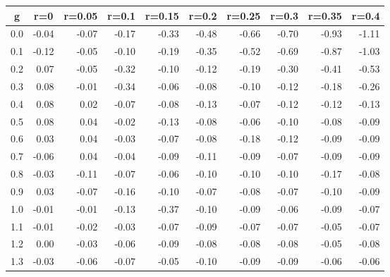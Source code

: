 %
\begin{table}[!tbp]
 \begin{center}
 \begin{tabular}{rrrrrrrrrr}\hline\hline
\multicolumn{1}{c}{g}&\multicolumn{1}{c}{r=0}&\multicolumn{1}{c}{r=0.05}&\multicolumn{1}{c}{r=0.1}&\multicolumn{1}{c}{r=0.15}&\multicolumn{1}{c}{r=0.2}&\multicolumn{1}{c}{r=0.25}&\multicolumn{1}{c}{r=0.3}&\multicolumn{1}{c}{r=0.35}&\multicolumn{1}{c}{r=0.4}\tabularnewline
\hline
0.0&-0.04&-0.07&-0.17&-0.33&-0.48&-0.66&-0.70&-0.93&-1.11\tabularnewline
0.1&-0.12&-0.05&-0.10&-0.19&-0.35&-0.52&-0.69&-0.87&-1.03\tabularnewline
0.2& 0.07&-0.05&-0.32&-0.10&-0.12&-0.19&-0.30&-0.41&-0.53\tabularnewline
0.3& 0.08&-0.01&-0.34&-0.06&-0.08&-0.10&-0.12&-0.18&-0.26\tabularnewline
0.4& 0.08& 0.02&-0.07&-0.08&-0.13&-0.07&-0.12&-0.12&-0.13\tabularnewline
0.5& 0.08& 0.04&-0.02&-0.13&-0.08&-0.06&-0.10&-0.08&-0.09\tabularnewline
0.6& 0.03& 0.04&-0.03&-0.07&-0.08&-0.18&-0.12&-0.09&-0.09\tabularnewline
0.7&-0.06& 0.04&-0.04&-0.09&-0.11&-0.09&-0.07&-0.09&-0.09\tabularnewline
0.8&-0.03&-0.11&-0.07&-0.06&-0.10&-0.10&-0.10&-0.17&-0.08\tabularnewline
0.9& 0.03&-0.07&-0.16&-0.10&-0.07&-0.08&-0.07&-0.10&-0.09\tabularnewline
1.0&-0.01&-0.01&-0.13&-0.37&-0.10&-0.09&-0.06&-0.09&-0.07\tabularnewline
1.1&-0.01&-0.02&-0.03&-0.07&-0.09&-0.07&-0.07&-0.05&-0.07\tabularnewline
1.2& 0.00&-0.03&-0.06&-0.09&-0.08&-0.08&-0.08&-0.05&-0.08\tabularnewline
1.3&-0.03&-0.06&-0.07&-0.05&-0.10&-0.09&-0.09&-0.06&-0.06\tabularnewline
\hline
\end{tabular}

\end{center}

\end{table}

